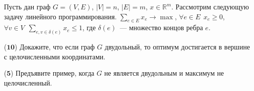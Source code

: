 Пусть дан граф $G = (V, E)$, $|V| = n$, $|E| = m$, $x \in \mathbb{R}^m$. Рассмотрим следующую задачу линейного
программирования. $\sum\limits_{e \in E} x_e \rightarrow \max$, $\forall e \in E ~~ x_e \ge 0$, $\forall v \in V ~~
\sum\limits_{e, v \in \delta(e)} x_e \le 1$, где $\delta(e)$~--- множество концов ребра $e$.
\begin{enumcyr}
    \item ($\mathbf{10}$) Докажите, что если граф $G$ двудольный, то оптимум достигается в вершине с целочисленными
	    координатами.
    \item ($\mathbf{5}$) Предъявите пример, когда $G$ не является двудольным и максимум не целочисленный.
\end{enumcyr}